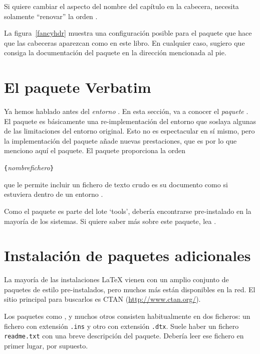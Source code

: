 Si quiere cambiar el aspecto del nombre del capítulo en la cabecera,
necesita solamente ``renovar'' la orden
. 

La figura~\ref{fancyhdr} muestra una configuración posible para el
paquete  que hace que las cabeceras aparezcan como en
este libro.  En cualquier caso, sugiero que consiga la documentación
del paquete en la dirección mencionada al pie.

\section{El paquete Verbatim}

Ya hemos hablado antes del \emph{entorno} .  En esta
sección, va a conocer el \emph{paquete} .  El paquete
 es básicamente una re-implementación del entorno
 que soslaya algunas de las limitaciones del entorno
 original.  Esto no es espectacular en sí mismo, pero la
implementación del paquete  añade nuevas prestaciones,
que es por lo que menciono aquí el paquete.  El paquete 
proporciona la orden

\begin{lscommand}
\verb|{|\emph{nombrefichero}\verb|}|
\end{lscommand}

\noindent que le permite incluir un fichero de texto crudo es su
documento como si estuviera dentro de un entorno .

Como el paquete   es parte del lote `tools', debería
encontrarse pre-instalado en la mayoría de los sistemas.  Si quiere
saber más sobre este paquete, lea \cite{verbatim}.


\section{Instalación de paquetes adicionales}\label{sec:Packages}

La mayoría de las instalaciones \LaTeX{} vienen con un amplio conjunto
de paquetes de estilo pre-instalados, pero muchos más están
disponibles en la red.  El sitio principal para buscarlos es CTAN
(\url{http://www.ctan.org/}).

Los paquetes como ,  y muchos otros
consisten habitualmente en dos ficheros: un fichero con extensión
\texttt{.ins} y otro con extensión \texttt{.dtx}.  Suele haber un
fichero \texttt{readme.txt} con una breve descripción del paquete.
Debería leer ese fichero en primer lugar, por supuesto.

